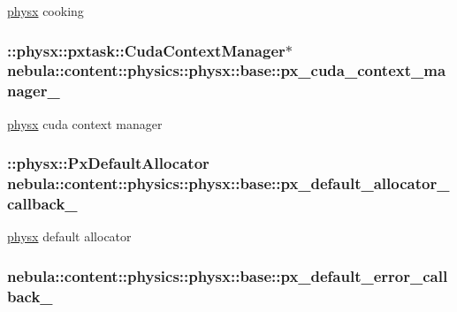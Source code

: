 \hyperlink{namespacenebula_1_1content_1_1physics_1_1physx}{physx} cooking \hypertarget{classnebula_1_1content_1_1physics_1_1physx_1_1base_a5ab3137c188f8c453466c5ec756345d0}{
\subsubsection[{px\_\-cuda\_\-context\_\-manager\_\-}]{\setlength{\rightskip}{0pt plus 5cm}::physx::pxtask::CudaContextManager$\ast$ {\bf nebula::content::physics::physx::base::px\_\-cuda\_\-context\_\-manager\_\-}}}
\label{classnebula_1_1content_1_1physics_1_1physx_1_1base_a5ab3137c188f8c453466c5ec756345d0}


\hyperlink{namespacenebula_1_1content_1_1physics_1_1physx}{physx} cuda context manager \hypertarget{classnebula_1_1content_1_1physics_1_1physx_1_1base_a96d34b7d39992a17aaea21c6fa961297}{
\subsubsection[{px\_\-default\_\-allocator\_\-callback\_\-}]{\setlength{\rightskip}{0pt plus 5cm}::physx::PxDefaultAllocator {\bf nebula::content::physics::physx::base::px\_\-default\_\-allocator\_\-callback\_\-}}}
\label{classnebula_1_1content_1_1physics_1_1physx_1_1base_a96d34b7d39992a17aaea21c6fa961297}


\hyperlink{namespacenebula_1_1content_1_1physics_1_1physx}{physx} default allocator \hypertarget{classnebula_1_1content_1_1physics_1_1physx_1_1base_a6efc236e04cd382bb2725346ab1b782c}{
\subsubsection[{px\_\-default\_\-error\_\-callback\_\-}]{ {\bf nebula::content::physics::physx::base::px\_\-default\_\-error\_\-callback\_\-}}}
\label{classnebula_1_1content_1_1physics_1_1physx_1_1base_a6efc236e04cd382bb2725346ab1b782c}


